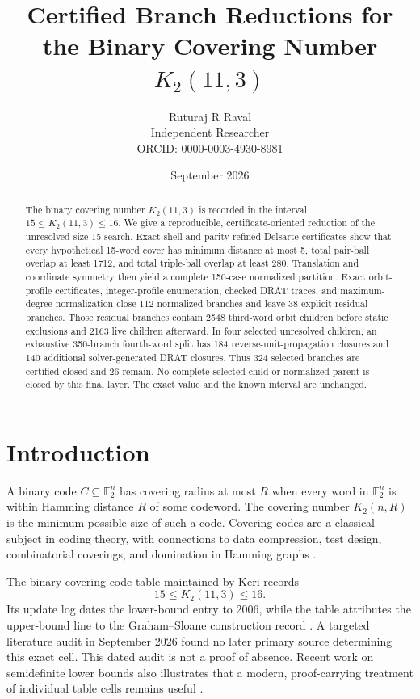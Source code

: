 \documentclass[11pt]{article}
\title{Certified Branch Reductions for the Binary Covering Number
  $K_2(11,3)$}
\author{Ruturaj R Raval\\
  Independent Researcher\\
  \href{https://orcid.org/0000-0003-4930-8981}
  {ORCID: 0000-0003-4930-8981}}
\date{September 2026}
\theoremstyle{definition}
\theoremstyle{remark}
\newcommand{\F}{\mathbb F}
\begin{document}
\maketitle

\begin{abstract}
The binary covering number $K_2(11,3)$ is recorded in the interval
$15\leq K_2(11,3)\leq16$.  We give a reproducible, certificate-oriented
reduction of the unresolved size-15 search.  Exact shell and
parity-refined Delsarte certificates show that every hypothetical
15-word cover has minimum distance at most 5, total pair-ball overlap at
least 1712, and total triple-ball overlap at least 280.  Translation and
coordinate symmetry then yield a complete 150-case normalized
partition.  Exact orbit-profile certificates, integer-profile
enumeration, checked DRAT traces, and maximum-degree normalization close
112 normalized branches and leave 38 explicit residual branches.
Those residual branches contain 2548 third-word orbit children before
static exclusions and 2163 live children afterward.  In four selected
unresolved children, an exhaustive 350-branch fourth-word split has 184
reverse-unit-propagation closures and 140 additional solver-generated
DRAT closures.  Thus 324 selected branches are certified closed and 26
remain.  No complete selected child or normalized parent is closed by
this final layer.  The exact value and the known interval are unchanged.
\end{abstract}

\section{Introduction}

A binary code $C\subseteq\F_2^n$ has covering radius at most $R$ when
every word in $\F_2^n$ is within Hamming distance $R$ of some codeword.
The covering number $K_2(n,R)$ is the minimum possible size of such a
code.  Covering codes are a classical subject in coding theory, with
connections to data compression, test design, combinatorial coverings,
and domination in Hamming graphs \cite{cohen-book,graham-sloane}.

The binary covering-code table maintained by Keri records
\[
  15\leq K_2(11,3)\leq16.
\]
Its update log dates the lower-bound entry to 2006, while the table
attributes the upper-bound line to the Graham--Sloane construction
record \cite{keri-table,graham-sloane}.  A targeted literature audit in
September 2026 found no later primary source determining this exact
cell.  This dated audit is not a proof of absence.  Recent work on
semidefinite lower bounds also illustrates that a modern,
proof-carrying treatment of individual table cells remains useful
\cite{gijswijt-polak}.
\end{document}

